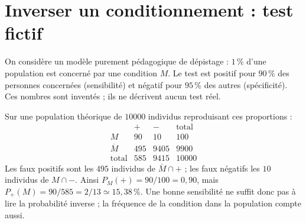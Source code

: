 \documentclass[../cours_2de.tex]{subfiles}
\begin{document}
\section{Inverser un conditionnement : test fictif}
On considère un modèle purement pédagogique de dépistage : $1\,\%$ d'une population est concerné par une condition $M$.
Le test est positif pour $90\,\%$ des personnes concernées (sensibilité) et négatif pour $95\,\%$ des autres (spécificité).
Ces nombres sont inventés ; ils ne décrivent aucun test réel.
\begin{center}
\end{center}
Sur une population théorique de $10000$ individus reproduisant ces proportions :
\[
\begin{array}{c|rr|r}
 &+&-&\text{total}\\\hline
M&90&10&100\\
\overline M&495&9405&9900\\\hline
\text{total}&585&9415&10000
\end{array}
\]
Les faux positifs sont les $495$ individus de $\overline M\cap+$ ; les faux négatifs les $10$ individus de $M\cap-$.
Ainsi $P_M(+)=90/100=0{,}90$, mais
$P_+(M)=90/585=2/13\simeq15{,}38\,\%$.
Une bonne sensibilité ne suffit donc pas à lire la probabilité inverse ; la fréquence de la condition dans la population compte aussi.
\end{document}
